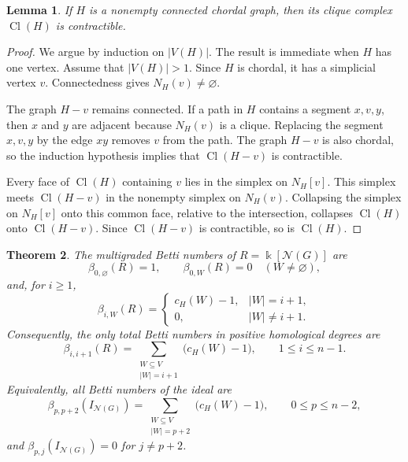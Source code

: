 \documentclass[10pt,a4paper]{amsart}
\newtheorem{theorem}{Theorem}[section]
\newtheorem{lemma}[theorem]{Lemma}
\numberwithin{equation}{section}
\newcommand{\NN}{\mathcal N}
\newcommand{\Cl}{\operatorname{Cl}}
\begin{document}
	\begin{lemma}\label{lem:chordal-clique-contractible}
		If \(H\) is a nonempty connected chordal graph, then its clique complex
		\(\Cl(H)\) is contractible.
	\end{lemma}
	
	\begin{proof}
		We argue by induction on \(|V(H)|\). The result is immediate when \(H\) has
		one vertex. Assume that \(|V(H)|>1\). Since \(H\) is chordal, it has a simplicial vertex \(v\). Connectedness gives
		\(N_H(v)\ne\varnothing\).
		
		The graph \(H-v\) remains connected. If a path in \(H\) contains a
		segment \(x,v,y\), then \(x\) and \(y\) are adjacent because \(N_H(v)\) is a
		clique. Replacing the segment \(x,v,y\) by the edge \(xy\) removes \(v\)
		from the path. The graph \(H-v\) is also chordal, so the induction hypothesis
		implies that \(\Cl(H-v)\) is contractible.
		
		Every face of \(\Cl(H)\) containing \(v\) lies in the simplex on
		\(N_H[v]\). This simplex meets \(\Cl(H-v)\) in the nonempty simplex on
		\(N_H(v)\). Collapsing the simplex on \(N_H[v]\) onto this common face,
		relative to the intersection, collapses \(\Cl(H)\) onto \(\Cl(H-v)\).
		Since \(\Cl(H-v)\) is contractible, so is \(\Cl(H)\).
	\end{proof}


	\begin{theorem}\label{thm:all-betti}
		The multigraded Betti numbers of \(R=\Bbbk[\NN(G)]\) are
		\[
		\beta_{0,\varnothing}(R)=1,
		\qquad
		\beta_{0,W}(R)=0\quad(W\ne\varnothing),
		\]
		and, for \(i\ge1\),
		\begin{equation}\label{eq:multigraded}
			\beta_{i,W}(R)=
			\begin{cases}
				c_H(W)-1,& |W|=i+1,\\
				0,& |W|\ne i+1.
			\end{cases}
		\end{equation}
		Consequently, the only total Betti numbers in positive homological degrees are
		\begin{equation}\label{eq:component-total}
			\beta_{i,i+1}(R)=
			\sum_{\substack{W\subseteq V\\|W|=i+1}}
			\bigl(c_H(W)-1\bigr),\qquad 1\le i\le n-1.
		\end{equation}
		Equivalently, all Betti numbers of the ideal are
		\[
		\beta_{p,p+2}(I_{\NN(G)})
		=
		\sum_{\substack{W\subseteq V\\|W|=p+2}}
		\bigl(c_H(W)-1\bigr),\qquad 0\le p\le n-2,
		\]
		and \(\beta_{p,j}(I_{\NN(G)})=0\) for \(j\ne p+2\).
	\end{theorem}
\end{document}
